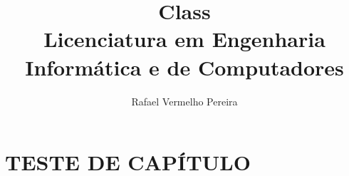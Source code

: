 \documentclass[12pt]{report}
\title{\textbf{\Huge Class}\\
Licenciatura em Engenharia Informática e de Computadores}
\author{Rafael Vermelho Pereira}
\begin{document}
\maketitle
\tableofcontents

\chapter{TESTE DE CAPÍTULO}
\end{document}
